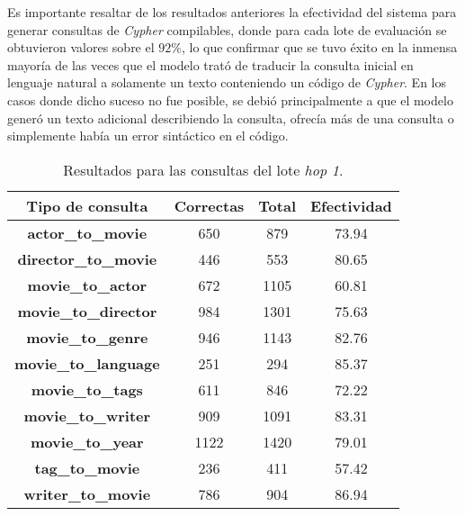 Es importante resaltar de los resultados anteriores la efectividad del sistema para generar consultas de \textit{Cypher} compilables, donde para cada lote de evaluación se obtuvieron valores sobre el $92\%$, lo que confirmar que se tuvo éxito en la inmensa mayoría de las veces que el modelo trató de traducir la consulta inicial en lenguaje natural a solamente un texto conteniendo un código de \textit{Cypher}. En los casos donde dicho suceso no fue posible, se debió principalmente a que el modelo generó un texto adicional describiendo la consulta, ofrecía más de una consulta o simplemente había un error sintáctico en el código.

\begin{table}[H]
\centering
\begin{tabular}{|c|c|c|c|}
\hline
\textbf{Tipo de consulta} & \textbf{Correctas} & \textbf{Total} & \textbf{Efectividad} \\ \hline
\textbf{actor\_to\_movie} & 650 & 879 & 73.94 \\ \hline
\textbf{director\_to\_movie} & 446 & 553 & 80.65 \\ \hline
\textbf{movie\_to\_actor} & 672 & 1105 & 60.81 \\ \hline
\textbf{movie\_to\_director} & 984 & 1301 & 75.63 \\ \hline
\textbf{movie\_to\_genre} & 946 & 1143 & 82.76 \\ \hline
\textbf{movie\_to\_language} & 251 & 294 & 85.37 \\ \hline
\textbf{movie\_to\_tags} & 611 & 846 & 72.22 \\ \hline
\textbf{movie\_to\_writer} & 909 & 1091 & 83.31 \\ \hline
\textbf{movie\_to\_year} & 1122 & 1420 & 79.01 \\ \hline
\textbf{tag\_to\_movie} & 236 & 411 & 57.42 \\ \hline
\textbf{writer\_to\_movie} & 786 & 904 & 86.94 \\ \hline
\end{tabular}
\caption{Resultados para las consultas del lote \textit{hop 1}.}
\label{tab:results3}
\end{table}

